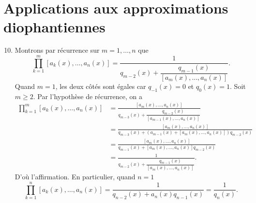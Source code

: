 \documentclass[french]{article}
\theoremstyle{definition}
\begin{document}
\section*{Applications aux approximations diophantiennes}
\begin{enumerate}
    \setcounter{enumi}{9}
    \item \label{Partie10} Montrons par r\'ecurrence sur $m = 1,\ldots,n$ que
        $$\prod_{k = 1}^m [a_k(x),\ldots,a_n(x)] =  \frac{1}{q_{m-2}(x) + \dfrac{q_{m-1}(x)}{[a_m(x),\ldots,a_n(x)]}}.$$
    Quand $m = 1$, les deux c\^ot\'es sont \'egales car $q_{-1}(x) = 0$ et $q_0(x) = 1$. Soit $m \ge 2$. Par l'hypoth\`ese de r\'ecurrence, on a
        \begin{align*}
            \prod_{k = 1}^m [a_k(x),\ldots,a_n(x)] & = \frac{[a_m(x),\ldots,a_n(x)]}{q_{m-3}(x) + \dfrac{q_{m-2}(x)}{[a_{m-1}(x),\ldots,a_n(x)]}} \\
            & = \frac{[a_m(x),\ldots,a_n(x)]}{q_{m-3}(x) + (a_{m-1}(x) + [a_m(x),\ldots,a_n(x)])q_{m-2}(x)} \\
            & = \frac{[a_m(x),\ldots,a_n(x)]}{q_{m-1}(x) + [a_m(x),\ldots,a_n(x)]q_{m-2}(x)}\\
            & = \frac{1}{q_{m-2}(x) + \dfrac{q_{m-1}(x)}{[a_m(x),\ldots,a_n(x)]}}.
        \end{align*}
    D'o\`u l'affirmation. En particulier, quand $n = 1$
        $$\prod_{k = 1}^n [a_k(x),\ldots,a_n(x)] = \frac{1}{q_{n-2}(x) + a_n(x)q_{n-1}(x)} = \frac{1}{q_n(x)}.$$
        

\end{enumerate}
\end{document}
